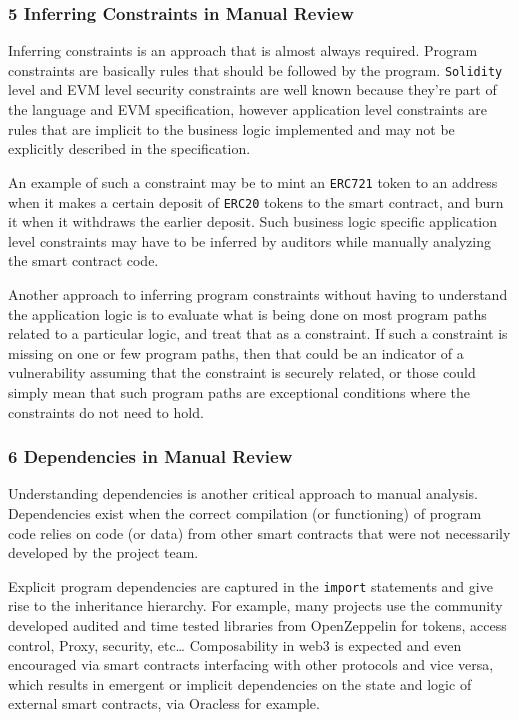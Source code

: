 \subsubsection{5 Inferring Constraints in Manual
Review}\label{inferring-constraints-in-manual-review}

Inferring constraints is an approach that is almost always required.
Program constraints are basically rules that should be followed by the
program. \texttt{Solidity} level and EVM level security constraints are
well known because they're part of the language and EVM specification,
however application level constraints are rules that are implicit to the
business logic implemented and may not be explicitly described in the
specification.

An example of such a constraint may be to mint an \texttt{ERC721} token
to an address when it makes a certain deposit of \texttt{ERC20} tokens
to the smart contract, and burn it when it withdraws the earlier
deposit. Such business logic specific application level constraints may
have to be inferred by auditors while manually analyzing the smart
contract code.

Another approach to inferring program constraints without having to
understand the application logic is to evaluate what is being done on
most program paths related to a particular logic, and treat that as a
constraint. If such a constraint is missing on one or few program paths,
then that could be an indicator of a vulnerability assuming that the
constraint is securely related, or those could simply mean that such
program paths are exceptional conditions where the constraints do not
need to hold.

\subsubsection{6 Dependencies in Manual
Review}\label{dependencies-in-manual-review}

Understanding dependencies is another critical approach to manual
analysis. Dependencies exist when the correct compilation (or
functioning) of program code relies on code (or data) from other smart
contracts that were not necessarily developed by the project team.

Explicit program dependencies are captured in the \texttt{import}
statements and give rise to the inheritance hierarchy. For example, many
projects use the community developed audited and time tested libraries
from OpenZeppelin for tokens, access control, Proxy, security,
etc\ldots{} Composability in web3 is expected and even encouraged via
smart contracts interfacing with other protocols and vice versa, which
results in emergent or implicit dependencies on the state and logic of
external smart contracts, via Oracless for example.

